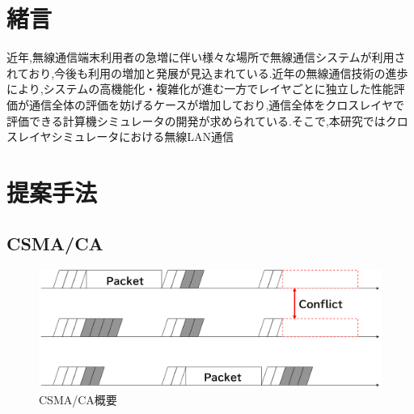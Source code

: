 \documentclass[a4paper, 10pt]{ltjsarticle}
\begin{document}
\setlength{\columnsep}{7.5mm}

\twocolumn[
    \begin{center}
        {\vspace{-1em}}

        {\fontsize{15pt}{15pt}\selectfont{クロスレイヤシミュレータ開発における無線LANシミュレータの開発}}

        {\vspace{1.3em}}

        {\fontsize{13pt}{13pt}\selectfont{Development of a Wireless LAN Simulator for Cross-Layer Simulator Development }}
    \end{center}

    \vspace{0.1em}

    \begin{flushright}
      {\fontsize{11pt}{11pt}\selectfont{T5-16　下沢亮太郎\\}}
      {\fontsize{11pt}{11pt}\selectfont{指導教員　設樂勇}}
    \end{flushright}

    \vspace{1em}

    \thispagestyle{empty}
]

\section{緒言}
近年,無線通信端末利用者の急増に伴い様々な場所で無線通信システムが利用されており,今後も利用の増加と発展が見込まれている.近年の無線通信技術の進歩により,システムの高機能化・複雑化が進む一方でレイヤごとに独立した性能評価が通信全体の評価を妨げるケースが増加しており,通信全体をクロスレイヤで評価できる計算機シミュレータの開発が求められている.そこで,本研究ではクロスレイヤシミュレータにおける無線LAN通信


\section{提案手法}

\subsection{CSMA/CA}

\begin{figure}[h]
  \centering
  \includegraphics[width=1\columnwidth]{./assets/csmaca-1.png}
  \caption{CSMA/CA概要}
\end{figure}
\end{document}
